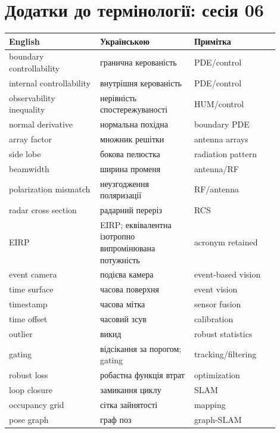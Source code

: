 \chapter{Додатки до термінології: сесія 06}
\begin{longtable}{L{0.30\linewidth}L{0.31\linewidth}L{0.29\linewidth}}
\toprule
English & Українською & Примітка \\
\midrule
\endhead
boundary controllability & гранична керованість & PDE/control \\
internal controllability & внутрішня керованість & PDE/control \\
observability inequality & нерівність спостережуваності & HUM/control \\
normal derivative & нормальна похідна & boundary PDE \\
array factor & множник решітки & antenna arrays \\
side lobe & бокова пелюстка & radiation pattern \\
beamwidth & ширина променя & antenna/RF \\
polarization mismatch & неузгодження поляризації & RF/antenna \\
radar cross section & радарний переріз & RCS \\
EIRP & EIRP; еквівалентна ізотропно випромінювана потужність & acronym retained \\
event camera & подієва камера & event-based vision \\
time surface & часова поверхня & event vision \\
timestamp & часова мітка & sensor fusion \\
time offset & часовий зсув & calibration \\
outlier & викид & robust statistics \\
gating & відсікання за порогом; gating & tracking/filtering \\
robust loss & робастна функція втрат & optimization \\
loop closure & замикання циклу & SLAM \\
occupancy grid & сітка зайнятості & mapping \\
pose graph & граф поз & graph-SLAM \\
\bottomrule
\end{longtable}
